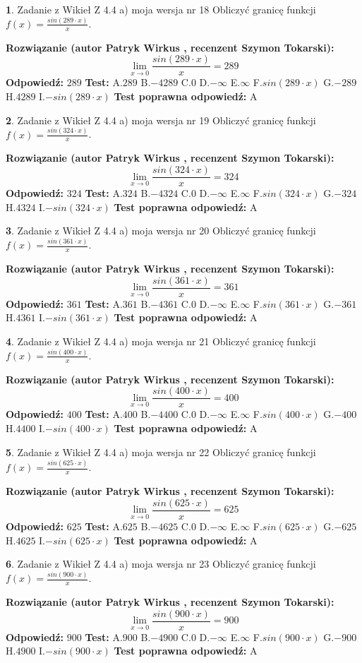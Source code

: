 \documentclass[12pt, a4paper]{article}
\theoremstyle{definition} %
\newtheorem{zad}{}
\newcommand{\zadStart}[1]{\begin{zad}#1\newline}
\newcommand{\zadStop}{\end{zad}}
\newcommand{\rozwStart}[2]{\noindent \textbf{Rozwiązanie (autor #1 , recenzent #2): }\newline}
\newcommand{\rozwStop}{\newline}
\newcommand{\odpStart}{\noindent \textbf{Odpowiedź:}\newline}
\newcommand{\odpStop}{\newline}
\newcommand{\testStart}{\noindent \textbf{Test:}\newline}
\newcommand{\testStop}{\newline}
\newcommand{\kluczStart}{\noindent \textbf{Test poprawna odpowiedź:}\newline}
\newcommand{\kluczStop}{\newline}
\begin{document}
\zadStart{Zadanie z Wikieł Z 4.4 a) moja wersja nr 18}
Obliczyć granicę funkcji $f(x)=\frac{sin(289\cdot x)}{x}$.
\zadStop
\rozwStart{Patryk Wirkus}{Szymon Tokarski}
$$\lim\limits_{x\to 0}\frac{sin(289\cdot x)}{x}=
289$$
\rozwStop
\odpStart
$289$
\odpStop
\testStart
A.$289$
B.$-4289$
C.$0$
D.$-\infty$
E.$\infty$
F.$sin(289\cdot x)$
G.$-289$
H.$4289$
I.$-sin(289\cdot x)$
\testStop
\kluczStart
A
\kluczStop



\zadStart{Zadanie z Wikieł Z 4.4 a) moja wersja nr 19}
Obliczyć granicę funkcji $f(x)=\frac{sin(324\cdot x)}{x}$.
\zadStop
\rozwStart{Patryk Wirkus}{Szymon Tokarski}
$$\lim\limits_{x\to 0}\frac{sin(324\cdot x)}{x}=
324$$
\rozwStop
\odpStart
$324$
\odpStop
\testStart
A.$324$
B.$-4324$
C.$0$
D.$-\infty$
E.$\infty$
F.$sin(324\cdot x)$
G.$-324$
H.$4324$
I.$-sin(324\cdot x)$
\testStop
\kluczStart
A
\kluczStop



\zadStart{Zadanie z Wikieł Z 4.4 a) moja wersja nr 20}
Obliczyć granicę funkcji $f(x)=\frac{sin(361\cdot x)}{x}$.
\zadStop
\rozwStart{Patryk Wirkus}{Szymon Tokarski}
$$\lim\limits_{x\to 0}\frac{sin(361\cdot x)}{x}=
361$$
\rozwStop
\odpStart
$361$
\odpStop
\testStart
A.$361$
B.$-4361$
C.$0$
D.$-\infty$
E.$\infty$
F.$sin(361\cdot x)$
G.$-361$
H.$4361$
I.$-sin(361\cdot x)$
\testStop
\kluczStart
A
\kluczStop



\zadStart{Zadanie z Wikieł Z 4.4 a) moja wersja nr 21}
Obliczyć granicę funkcji $f(x)=\frac{sin(400\cdot x)}{x}$.
\zadStop
\rozwStart{Patryk Wirkus}{Szymon Tokarski}
$$\lim\limits_{x\to 0}\frac{sin(400\cdot x)}{x}=
400$$
\rozwStop
\odpStart
$400$
\odpStop
\testStart
A.$400$
B.$-4400$
C.$0$
D.$-\infty$
E.$\infty$
F.$sin(400\cdot x)$
G.$-400$
H.$4400$
I.$-sin(400\cdot x)$
\testStop
\kluczStart
A
\kluczStop



\zadStart{Zadanie z Wikieł Z 4.4 a) moja wersja nr 22}
Obliczyć granicę funkcji $f(x)=\frac{sin(625\cdot x)}{x}$.
\zadStop
\rozwStart{Patryk Wirkus}{Szymon Tokarski}
$$\lim\limits_{x\to 0}\frac{sin(625\cdot x)}{x}=
625$$
\rozwStop
\odpStart
$625$
\odpStop
\testStart
A.$625$
B.$-4625$
C.$0$
D.$-\infty$
E.$\infty$
F.$sin(625\cdot x)$
G.$-625$
H.$4625$
I.$-sin(625\cdot x)$
\testStop
\kluczStart
A
\kluczStop



\zadStart{Zadanie z Wikieł Z 4.4 a) moja wersja nr 23}
Obliczyć granicę funkcji $f(x)=\frac{sin(900\cdot x)}{x}$.
\zadStop
\rozwStart{Patryk Wirkus}{Szymon Tokarski}
$$\lim\limits_{x\to 0}\frac{sin(900\cdot x)}{x}=
900$$
\rozwStop
\odpStart
$900$
\odpStop
\testStart
A.$900$
B.$-4900$
C.$0$
D.$-\infty$
E.$\infty$
F.$sin(900\cdot x)$
G.$-900$
H.$4900$
I.$-sin(900\cdot x)$
\testStop
\kluczStart
A
\kluczStop
\end{document}
